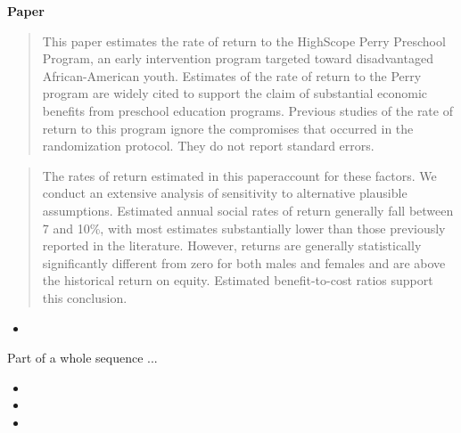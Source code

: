 \begin{frame}\begin{center}
{\LARGE\textbf{Paper}}
\end{center}\end{frame}
\begin{frame}
\begin{quote}\small
This paper estimates the rate of return to the HighScope Perry Preschool Program, an early intervention
program targeted toward disadvantaged African-American youth. Estimates of the rate of return to the Perry
program are widely cited to support the claim of substantial economic benefits from preschool education
programs. Previous studies of the rate of return to this program ignore the compromises that occurred in the
randomization protocol. They do not report standard errors.
\end{quote}
\end{frame}
\begin{frame}
\begin{quote}\small
The rates of return estimated in this paperaccount for these factors. We conduct an extensive analysis of sensitivity to alternative plausible
assumptions. Estimated annual social rates of return generally fall between 7 and 10\%, with most estimates
substantially lower than those previously reported in the literature. However, returns are generally
statistically significantly different from zero for both males and females and are above the historical return
on equity. Estimated benefit-to-cost ratios support this conclusion.
\end{quote}
\end{frame}
\begin{frame}
\begin{itemize}
\item{}
\end{itemize}
Part of a whole sequence ...

{\scriptsize\begin{itemize}
\item{}
\item{}
\item{}
\end{itemize}}
\end{frame}
